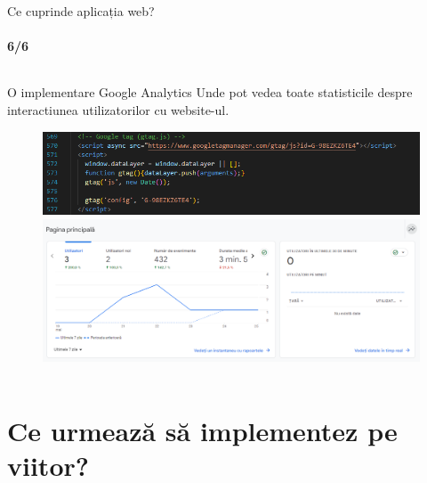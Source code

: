 \documentclass{beamer}
\begin{document}
\begin{darkframes}
		\begin{frame}[label=math]{Ce cuprinde aplicația web?}
			\vspace{-1em}
			\framesubtitle{6/6}
			\begin{columns}[t]
				\begin{column}{1\textwidth}
					\begin{exampleblock}{O implementare Google Analytics}
						\tiny
						Unde pot vedea \alert{toate statisticile despre interactiunea utilizatorilor cu website-ul.}
					\end{exampleblock}
					\vspace{0em}
					\begin{figure}[!tbp]
						\centering
						\begin{minipage}[t]{0.7\textwidth}
							\centering
							\includegraphics[width=\textwidth]{codgoogle.png}
						\end{minipage}
						\hfill
						
						\vspace{0.5em}
						
						\begin{minipage}[t]{0.7\textwidth}
							\centering
							\includegraphics[width=\textwidth]{google.png}
						\end{minipage}
						\hfill
					\end{figure}
				\end{column}
			\end{columns}
		\end{frame}
		
		\section{Ce urmează să implementez pe viitor?}
		

\end{darkframes}
\end{document}
